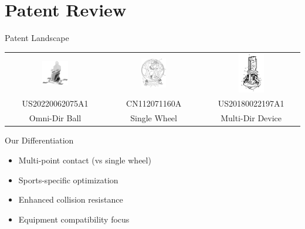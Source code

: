 \documentclass[aspectratio=169]{beamer}
\begin{document}
\section{Patent Review}

\begin{frame}{Patent Landscape}
\begin{center}
\begin{tabular}{ccc}
\includegraphics[width=0.28\textwidth]{pdpAssets/US20220062075A1.png} &
\includegraphics[width=0.28\textwidth]{pdpAssets/CN112071160A.png} &
\includegraphics[width=0.28\textwidth]{pdpAssets/US20180022197A1.png} \\
\footnotesize US20220062075A1 & \footnotesize CN112071160A & \footnotesize US20180022197A1 \\
\footnotesize Omni-Dir Ball & \footnotesize Single Wheel & \footnotesize Multi-Dir Device \\
\end{tabular}
\end{center}

\vspace{0.3cm}
\begin{block}{Our Differentiation}
\begin{itemize}
    \item Multi-point contact (vs single wheel)
    \item Sports-specific optimization
    \item Enhanced collision resistance
    \item Equipment compatibility focus
\end{itemize}
\end{block}
\end{frame}
\end{document}
